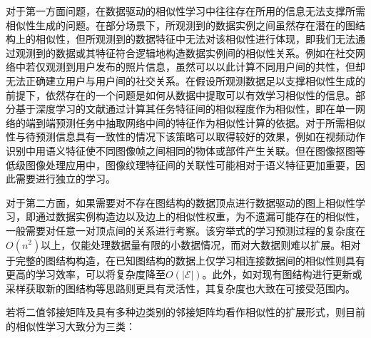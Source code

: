 对于第一方面问题，在数据驱动的相似性学习中往往存在所用的信息无法支撑所需相似性生成的问题。在部分场景下，所观测到的数据实例之间虽然存在潜在的图结构上的相似性，但所观测到的数据特征中无法对该相似性进行体现，即我们无法通过观测到的数据或其特征符合逻辑地构造数据实例间的相似性关系。例如在社交网络中若仅观测到用户发布的照片信息，虽然可以以此计算不同用户间的共性，但却无法正确建立用户与用户间的社交关系。在假设所观测数据足以支撑相似性生成的前提下，依然存在的一个问题是如何从数据中提取可以有效学习相似性的信息。部分基于深度学习的文献通过计算其任务特征间的相似程度作为相似性\cite{velivckovic2017graph,wang2018non}，即在单一网络的端到端预测任务中抽取网络中间的特征作为相似性计算的依据。对于所需相似性与待预测信息具有一致性的情况下该策略可以取得较好的效果，例如在视频动作识别中用语义特征使不同图像帧之间相同的物体或部件产生关联\cite{wang2018non}。但在图像抠图等低级图像处理应用中，图像纹理特征间的关联性可能相对于语义特征更加重要，因此需要进行独立的学习。

对于第二方面，如果需要对不存在图结构的数据顶点进行数据驱动的图上相似性学习，即通过数据实例构造边以及边上的相似性权重，为不遗漏可能存在的相似性，一般需要对任意一对顶点间的关系进行考察。该穷举式的学习预测过程的复杂度在$O(n^2)$以上，仅能处理数据量有限的小数据情况，而对大数据则难以扩展。相对于完整的图结构构造，在已知图结构的数据上仅学习相连接数据间的相似性则具有更高的学习效率，可以将复杂度降至$O(|\mathcal{E}|)$。此外，如对现有图结构进行更新或采样获取新的图结构等思路则更具有灵活性，其复杂度也大致在可接受范围内。

若将二值邻接矩阵及具有多种边类别的邻接矩阵均看作相似性的扩展形式，则目前的相似性学习大致分为三类：


